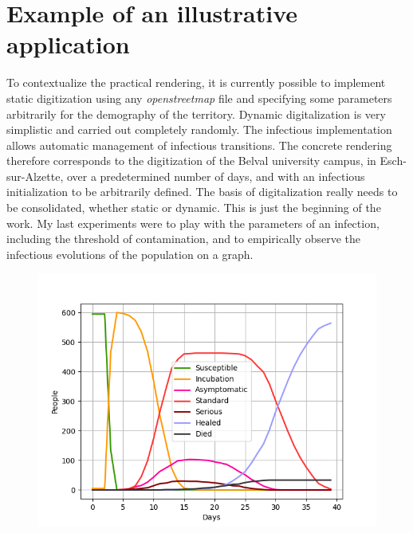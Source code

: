 \chapter{Example of an illustrative application}

 To contextualize the practical rendering, it is currently possible to implement static digitization using any \textit{openstreetmap} file and specifying some parameters arbitrarily for the demography of the territory. Dynamic digitalization is very simplistic and carried out completely randomly. The infectious implementation allows automatic management of infectious transitions. The concrete rendering therefore corresponds to the digitization of the Belval university campus, in Esch-sur-Alzette, over a predetermined number of days, and with an infectious initialization to be arbitrarily defined. The basis of digitalization really needs to be consolidated, whether static or dynamic. This is just the beginning of the work. My last experiments were to play with the parameters of an infection, including the threshold of contamination, and to empirically observe the infectious evolutions of the population on a graph.\\

\pagebreak

\begin{figure}[h]
  \centering
  \includegraphics[width=\linewidth]{Media/ExperimentationBelval.png}
  \caption{}
  \label{fig:experimentationbelval}
\end{figure}


